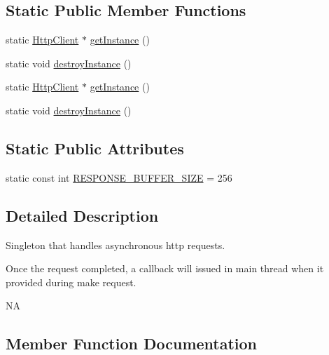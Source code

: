 \subsection*{Static Public Member Functions}
\begin{DoxyCompactItemize}
\item 
static \hyperlink{classnetwork_1_1HttpClient}{Http\+Client} $\ast$ \hyperlink{classnetwork_1_1HttpClient_aaa75d95d6615df0a573ee4839a49bb8a}{get\+Instance} ()
\item 
static void \hyperlink{classnetwork_1_1HttpClient_a468c50b7683b5b4a49f499ae052a0aa1}{destroy\+Instance} ()
\item 
static \hyperlink{classnetwork_1_1HttpClient}{Http\+Client} $\ast$ \hyperlink{classnetwork_1_1HttpClient_a545f440ef7035370d2d0731aa9935bea}{get\+Instance} ()
\item 
static void \hyperlink{classnetwork_1_1HttpClient_a9ee38b8135bf7a8161b857303a01c4ee}{destroy\+Instance} ()
\end{DoxyCompactItemize}
\subsection*{Static Public Attributes}
\begin{DoxyCompactItemize}
\item 
static const int \hyperlink{classnetwork_1_1HttpClient_aabc39c6245854ba7593237e8da6ca2ee}{R\+E\+S\+P\+O\+N\+S\+E\+\_\+\+B\+U\+F\+F\+E\+R\+\_\+\+S\+I\+ZE} = 256
\end{DoxyCompactItemize}


\subsection{Detailed Description}
Singleton that handles asynchronous http requests.

Once the request completed, a callback will issued in main thread when it provided during make request.

NA 

\subsection{Member Function Documentation}
\mbox{\label{classnetwork_1_1HttpClient_ad613c1b57bc56386255b36da94a3b18d}} 
